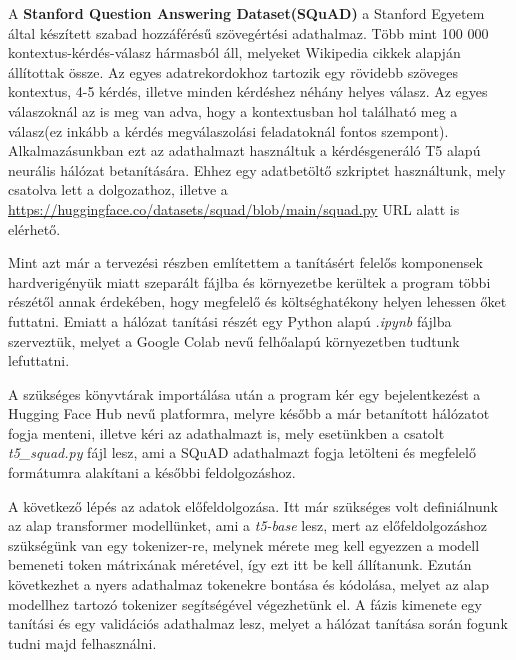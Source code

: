 
A \textbf{Stanford Question Answering Dataset(SQuAD)\cite{squad}} a Stanford Egyetem által készített szabad hozzáférésű szövegértési adathalmaz. Több mint 100 000 kontextus-kérdés-válasz hármasból áll, melyeket Wikipedia cikkek alapján állítottak össze. Az egyes adatrekordokhoz tartozik egy rövidebb szöveges kontextus, 4-5 kérdés, illetve minden kérdéshez néhány helyes válasz. Az egyes válaszoknál az is meg van adva, hogy a kontextusban hol található meg a válasz(ez inkább a kérdés megválaszolási feladatoknál fontos szempont). Alkalmazásunkban ezt az adathalmazt használtuk a kérdésgeneráló T5 alapú neurális hálózat betanítására. Ehhez egy adatbetöltő szkriptet használtunk, mely csatolva lett a dolgozathoz, illetve a \url{https://huggingface.co/datasets/squad/blob/main/squad.py} URL alatt is elérhető.





Mint azt már a tervezési részben említettem a tanításért felelős komponensek hardverigényük miatt szeparált fájlba és környezetbe kerültek a program többi részétől annak érdekében, hogy megfelelő és költséghatékony helyen lehessen őket futtatni. Emiatt a hálózat tanítási részét egy Python alapú \textit{.ipynb} fájlba szerveztük, melyet a Google Colab nevű felhőalapú környezetben tudtunk lefuttatni. 

A szükséges könyvtárak importálása után a program kér egy bejelentkezést a Hugging Face Hub nevű platformra, melyre később a már betanított hálózatot fogja menteni, illetve kéri az adathalmazt is, mely esetünkben a csatolt \textit{t5\_squad.py} fájl lesz, ami a SQuAD adathalmazt fogja letölteni és megfelelő formátumra alakítani a későbbi feldolgozáshoz.

A következő lépés az adatok előfeldolgozása. Itt már szükséges volt definiálnunk az alap transformer modellünket, ami a \textit{t5-base} lesz, mert az előfeldolgozáshoz szükségünk van egy tokenizer-re, melynek mérete meg kell egyezzen a modell bemeneti token mátrixának méretével, így ezt itt be kell állítanunk. Ezután következhet a nyers adathalmaz tokenekre bontása és kódolása, melyet az alap modellhez tartozó tokenizer segítségével végezhetünk el. A fázis kimenete egy tanítási és egy validációs adathalmaz lesz, melyet a hálózat tanítása során fogunk tudni majd felhasználni.

